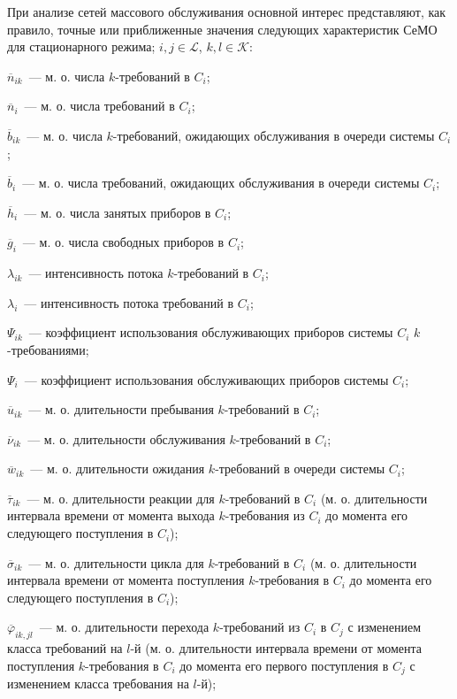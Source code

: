 При анализе сетей массового обслуживания основной интерес представляют, как правило, точные или приближенные значения следующих характеристик СеМО для стационарного режима; $i,j \in \mathscr{L}$, $k,l \in \mathscr{K}$:

$\overline{n}_{ik}$~--- м. о. числа $k$-требований в $C_i$;

$\overline{n}_i$~--- м. о. числа требований в $C_i$;

$\overline{b}_{ik}$~--- м. о. числа $k$-требований, ожидающих обслуживания в очереди системы $C_i$;

$\overline{b}_i$~--- м. о. числа требований, ожидающих обслуживания в очереди системы $C_i$;

$\overline{h}_i$~--- м. о. числа занятых приборов в $C_i$;

$\overline{g}_i$~--- м. о. числа свободных приборов в $C_i$;

$\lambda_{ik}$~--- интенсивность потока $k$-требований в $C_i$;

$\lambda_i$~--- интенсивность потока требований в $C_i$;

$\Psi_{ik}$~--- коэффициент использования обслуживающих приборов системы $C_i$ $k$-требованиями;

$\Psi_i$~--- коэффициент использования обслуживающих приборов системы $C_i$;

$\overline{u}_{ik}$~--- м. о. длительности пребывания $k$-требований в $C_i$;

$\overline{\nu}_{ik}$~--- м. о. длительности обслуживания $k$-требований в $C_i$;

$\overline{w}_{ik}$~--- м. о. длительности ожидания $k$-требований в очереди системы $C_i$;

$\overline{\tau}_{ik}$~--- м. о. длительности реакции для $k$-требований в $C_i$ (м. о. длительности интервала времени от момента выхода $k$-требования из $C_i$ до момента его следующего поступления в $C_i$);

$\overline{\sigma}_{ik}$~--- м. о. длительности цикла для $k$-требований в $C_i$ (м. о. длительности интервала времени от момента поступления $k$-требования в $C_i$ до момента его следующего поступления в $C_i$);

$\overline{\varphi}_{ik,jl}$~--- м. о. длительности перехода $k$-требований из $C_i$ в $C_j$ с изменением класса требований на $l$-й (м. о. длительности интервала времени от момента поступления $k$-требования в $C_i$ до момента его первого поступления в $C_j$ с изменением класса требования на $l$-й);

